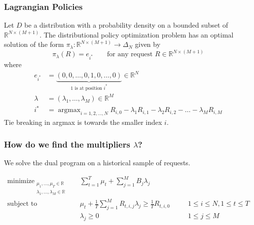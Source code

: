 \documentclass[usenames,dvipsnames]{beamer}
\DeclareMathOperator*{\argmax}{argmax}
\DeclareMathOperator*{\minimize}{minimize}
\DeclareMathOperator*{\subjectto}{subject\ to}
\newcommand{\R}{\mathbb{R}}
\begin{document}
\begin{frame}
\frametitle{Lagrangian Policies}

\begin{theorem}
Let $D$ be a distribution with a probability density on a bounded subset of
$\R^{N \times (M+1)}$. The distributional policy optimization problem has an
optimal solution of the form $\pi_\lambda:\R^{N \times (M+1)} \to \Delta_N$
given by
$$
\pi_\lambda(R) = e_{i^*} \qquad \text{for any request $R \in \R^{N \times (M+1)}$}
$$
where
\begin{align*}
e_{i^*} & = \underbrace{(0,0,\dots,0,1,0,\dots,0)}_{\text{$1$ is at position  $i^*$}} \in \R^N \\
\lambda & = (\lambda_1, \dots, \lambda_M) \in \R^M \\
i^* & = \argmax_{i=1,2,\dots,N} R_{i,0} - \lambda_1 R_{i,1} - \lambda_2 R_{i,2} - \dots - \lambda_M R_{i,M}
\end{align*}
Tie breaking in argmax is towards the smaller index $i$.
\end{theorem}
\end{frame}


\begin{frame}
\frametitle{How do we find the multipliers $\lambda$?}

We solve the dual program on a historical sample of requests.

\begin{align*}
\minimize_{\substack{\mu_1, \dots, \mu_T \in \R \\ \lambda_1, \dots, \lambda_M \in \R}} \quad & \sum_{t=1}^T \mu_t + \sum_{j=1}^M B_j \lambda_j \\
\subjectto \quad & \mu_t + \frac{1}{T} \sum_{j=1}^M R_{t,i,j} \lambda_j  \ge \frac{1}{T} R_{t,i,0} && \quad 1 \le i \le N, 1 \le t \le T \\
& \lambda_j \ge 0 && \quad 1 \le j \le M
\end{align*}

\end{frame}
\end{document}
